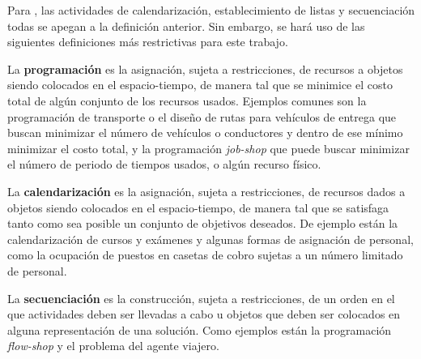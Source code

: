 \documentclass[draft,12pt,headsepline,footsepline,paper=letter]{scrreprt}
\renewenvironment{quotation}{\list{}{\leftmargin=0.25in}\item[]}{\endlist}
\begin{document}
Para \citet{wren95scheduling-timetabling}, las actividades de calendarización, establecimiento de listas y secuenciación todas se apegan a la definición anterior.
%
Sin embargo, se hará uso de las siguientes definiciones más restrictivas para este trabajo.

\begin{quotation}
La \textbf{programación} es la asignación, sujeta a restricciones, de recursos a objetos siendo colocados en el espacio-tiempo, de manera tal que se minimice el costo total de algún conjunto de los recursos usados. Ejemplos comunes son la programación de transporte o el diseño de rutas para vehículos de entrega que buscan minimizar el número de vehículos o conductores y dentro de ese mínimo minimizar el costo total, y la programación \textit{job-shop} que puede buscar minimizar el número de periodo de tiempos usados, o algún recurso físico.

La \textbf{calendarización} es la asignación, sujeta a restricciones, de recursos dados a objetos siendo colocados en el espacio-tiempo, de manera tal que se satisfaga tanto como sea posible un conjunto de objetivos deseados. De ejemplo están la calendarización de cursos y exámenes y algunas formas de asignación de personal, como la ocupación de puestos en casetas de cobro sujetas a un número limitado de personal.

La \textbf{secuenciación} es la construcción, sujeta a restricciones, de un orden en el que actividades deben ser llevadas a cabo u objetos que deben ser colocados en alguna representación de una solución. Como ejemplos están la programación \textit{flow-shop} y el problema del agente viajero.

\end{quotation}
\end{document}
